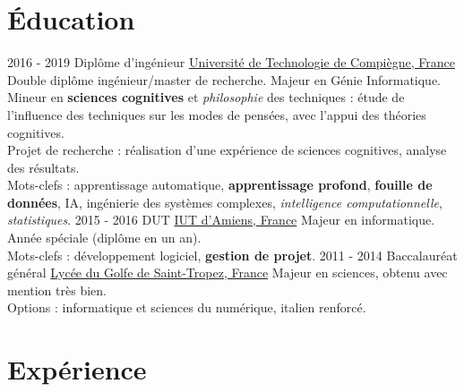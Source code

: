 \documentclass[a4paper]{twentysecondcv} %
\begin{document}
\makeprofile %


\section{Éducation}

\begin{twenty} %
	\twentyitem
    	{2016 - 2019}
        {}
        {Diplôme d'ingénieur}
        {\href{https://www.utc.fr/}{Université de Technologie de Compiègne, France}}
        {}
        {Double diplôme ingénieur/master de recherche. Majeur en Génie Informatique.\\Mineur en \textbf{sciences cognitives} et \textit{philosophie} des techniques : étude de l'influence des techniques sur les modes de pensées, avec l'appui des théories cognitives.\\Projet de recherche : réalisation d'une expérience de sciences cognitives, analyse des résultats.\\Mots-clefs : apprentissage automatique, \textbf{apprentissage profond}, \textbf{fouille de données}, IA, ingénierie des systèmes complexes, \textit{intelligence computationnelle}, \textit{statistiques}.}
	\twentyitem
    	{2015 - 2016}
        {}
        {DUT}
        {\href{http://www.iut-amiens.fr/}{IUT d'Amiens, France}}
        {}
        {Majeur en informatique.\\Année spéciale (diplôme en un an).\\Mots-clefs : développement logiciel, \textbf{gestion de projet}.}
	\twentyitem
    	{2011 - 2014}
		{}
        {Baccalauréat général}
        {\href{http://www.lyc-du-golfe-de-saint-tropez.ac-nice.fr/}{Lycée du Golfe de Saint-Tropez, France}}
        {}
        {Majeur en sciences, obtenu avec mention très bien.\\Options : informatique et sciences du numérique, italien renforcé.}
\end{twenty}


\section{Expérience}
\end{document}

